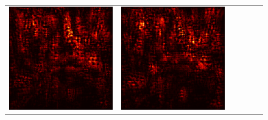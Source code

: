 \documentclass[preprint,12pt]{elsarticle}
\begin{document}
\begin{figure}[p]
\begin{tabular}{cccccc}
  \includegraphics[scale=\scale]{../visualizations/examples/imagenette/cnn/positive_saliency_map/1.png} & 
  \includegraphics[scale=\scale]{../visualizations/examples/imagenette/cnn/negative_saliency_map/1.png} & 

\end{tabular}
\end{figure}
\end{document}
